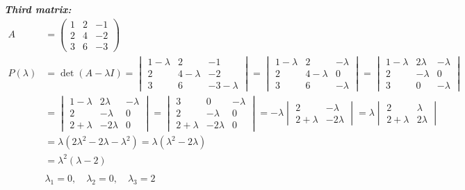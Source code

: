 \documentclass{article}
\begin{document}
\newpage
\noindent\textbf{\textit{Third matrix:}}
\begin{align*}
    A &= \begin{pmatrix} 1 & 2 & -1 \\ 2 & 4 & -2 \\ 3 & 6 & -3 \end{pmatrix} \\
    P(\lambda) &= \det(A - \lambda I) = \begin{vmatrix} 1 - \lambda & 2 & -1 \\ 2 & 4 - \lambda & -2 \\ 3 & 6 & -3 - \lambda \end{vmatrix}
    = \begin{vmatrix} 1 - \lambda & 2 & -\lambda \\ 2 & 4 - \lambda & 0 \\ 3 & 6 & -\lambda \end{vmatrix}
    = \begin{vmatrix} 1-\lambda & 2 \lambda & -\lambda \\ 2 & -\lambda & 0 \\ 3 & 0 & -\lambda \end{vmatrix} \\
    &= \begin{vmatrix} 1-\lambda & 2 \lambda & -\lambda \\ 2 & -\lambda & 0 \\ 2 + \lambda & -2 \lambda & 0 \end{vmatrix}
    = \begin{vmatrix} 3 & 0 & -\lambda \\ 2 & -\lambda & 0 \\ 2 + \lambda & -2 \lambda & 0 \end{vmatrix}
    = -\lambda \begin{vmatrix} 2 & -\lambda \\ 2 + \lambda & -2 \lambda \end{vmatrix} 
    = \lambda \begin{vmatrix} 2 & \lambda \\ 2 + \lambda & 2 \lambda \end{vmatrix} \\
    &= \lambda (2 \lambda^2 - 2 \lambda - \lambda^2)
    = \lambda (\lambda^2 - 2 \lambda) \\
    &= \lambda^2 (\lambda - 2) \\
    \\
    &\lambda_1 = 0, \quad \lambda_2 = 0, \quad \lambda_3 = 2 \\

\end{align*}
\end{document}
